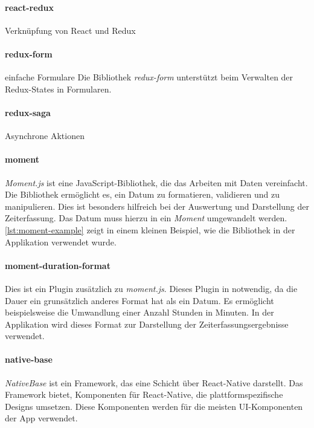 \paragraph{react-redux}

Verknüpfung von React und Redux

\paragraph{redux-form}
einfache Formulare
Die Bibliothek \textit{redux-form} unterstützt beim Verwalten der Redux-States in Formularen.

\paragraph{redux-saga}
Asynchrone Aktionen

\paragraph{moment}
\textit{Moment.js} ist eine JavaScript-Bibliothek, die das Arbeiten mit Daten vereinfacht. Die Bibliothek ermöglicht es,
ein Datum zu formatieren, validieren und zu manipulieren. Dies ist besonders hilfreich bei der Auswertung und Darstellung der
Zeiterfassung. Das Datum muss hierzu in ein \textit{Moment} umgewandelt werden. \autoref{lst:moment-example} zeigt in einem kleinen Beispiel,
wie die Bibliothek in der Applikation verwendet wurde.
% 

\paragraph{moment-duration-format}
Dies ist ein Plugin zusätzlich zu \textit{moment.js}. Dieses Plugin in notwendig, da die Dauer ein
grunsätzlich anderes Format hat als ein Datum. Es ermöglicht beispielsweise die Umwandlung einer Anzahl Stunden in Minuten.
In der Applikation wird dieses Format zur Darstellung der Zeiterfassungsergebnisse verwendet.



\paragraph{native-base}
\textit{NativeBase} ist ein Framework, das eine Schicht über React-Native darstellt. Das Framework bietet,
Komponenten für React-Native, die plattformspezifische Designs umsetzen. Diese Komponenten werden für die meisten UI-Komponenten der App
verwendet. %